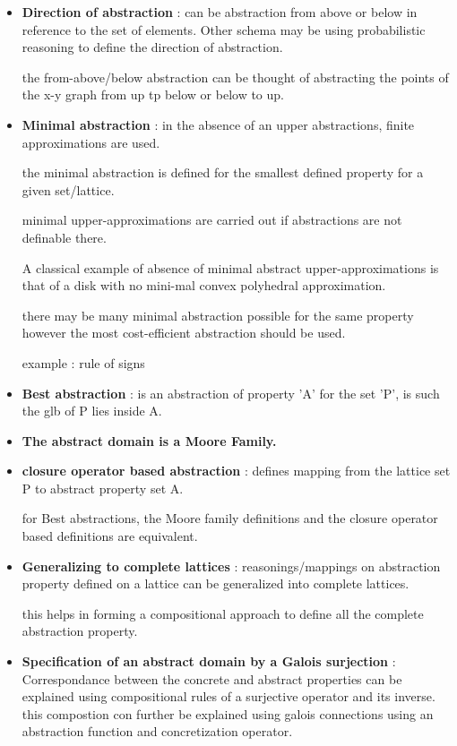 \begin{itemize}
{	it cannot define all the properties as concrete model.
	}

	\item{\textbf{Direction of abstraction} : can be abstraction from above or below in reference to the set of elements. Other schema may be using probabilistic reasoning to define the direction of abstraction.

	the from-above/below abstraction can be thought of abstracting the points of the x-y graph from up tp below or below to up.   
	}

	\item{\textbf{Minimal abstraction} : in the absence of an upper abstractions, finite approximations are used.

	the minimal abstraction is defined for the smallest defined property for a given set/lattice.

	minimal upper-approximations are carried out if abstractions are not definable there.

	A classical example of absence of minimal abstract upper-approximations is that of a disk with no mini-mal convex polyhedral approximation.

	there may be many minimal abstraction possible for the same property however the most cost-efficient abstraction should be used.

	example : rule of signs
	}

	\item{\textbf{Best abstraction} :  is an abstraction of property 'A' for the set 'P', is such the glb of P lies inside A.
	}

	\item{\textbf{The abstract domain is a Moore Family.}}

	\item{\textbf{closure operator based abstraction} : defines mapping from the lattice set P to abstract property set A.

	for Best abstractions, the Moore family definitions and the closure operator based definitions are equivalent.
	}

	\item{\textbf{Generalizing to complete lattices} : reasonings/mappings on abstraction property defined on a lattice can be generalized into complete lattices.

	this helps in forming a compositional approach to define all the complete abstraction property.
	}

	\item{\textbf{Specification of an abstract domain by a Galois surjection} : Correspondance between the concrete and abstract properties can be explained using compositional rules of a surjective operator and its inverse. this compostion con further be explained using galois connections using an abstraction function and concretization operator.
	}


\end{itemize}
